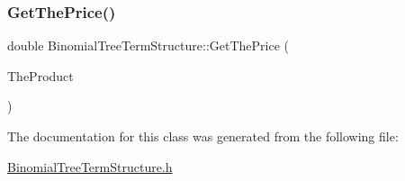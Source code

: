 \hypertarget{classBinomialTreeTermStructure_ab328bc5ad38c374992dc1d595e3465c4}{}\label{classBinomialTreeTermStructure_ab328bc5ad38c374992dc1d595e3465c4} 
\subsubsection{\texorpdfstring{Get\+The\+Price()}{GetThePrice()}}
{\footnotesize\ttfamily double Binomial\+Tree\+Term\+Structure\+::\+Get\+The\+Price (\begin{DoxyParamCaption}\item[{const \hyperlink{classTreeProduct}{Tree\+Product} \&}]{The\+Product }\end{DoxyParamCaption})}



The documentation for this class was generated from the following file\+:\begin{DoxyCompactItemize}
\item 
\hyperlink{BinomialTreeTermStructure_8h}{Binomial\+Tree\+Term\+Structure.\+h}\end{DoxyCompactItemize}

